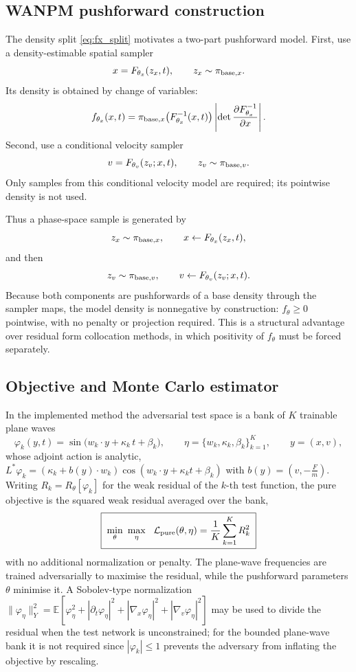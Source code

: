 \documentclass[11pt]{article}
\newcommand{\E}{\mathbb{E}}
\newcommand{\ph}{\varphi}
\theoremstyle{plain}
\begin{document}
\subsection{WANPM pushforward construction}

The density split \eqref{eq:fx_split} motivates a two-part pushforward model. First, use a density-estimable spatial sampler
\[
x=F_{\theta_x}(z_x,t),
\qquad z_x\sim \pi_{{\rm base},x}.
\]
Its density is obtained by change of variables:
\begin{equation}
f_{\theta_x}(x,t)
=
\pi_{{\rm base},x}\big(F_{\theta_x}^{-1}(x,t)\big)
\left|\det\frac{\partial F_{\theta_x}^{-1}}{\partial x}\right|.
\label{eq:flow_density}
\end{equation}
Second, use a conditional velocity sampler
\[
v=F_{\theta_v}(z_v;x,t),
\qquad z_v\sim \pi_{{\rm base},v}.
\]
Only samples from this conditional velocity model are required; its pointwise density is not used.

Thus a phase-space sample is generated by
\[
z_x\sim\pi_{{\rm base},x},\qquad x\leftarrow F_{\theta_x}(z_x,t),
\]
and then
\[
z_v\sim\pi_{{\rm base},v},\qquad v\leftarrow F_{\theta_v}(z_v;x,t).
\]
Because both components are pushforwards of a base density through the sampler maps, the model density is nonnegative by construction: $f_{\theta}\ge 0$ pointwise, with no penalty or projection required. This is a structural advantage over residual form collocation methods, in which positivity of $f_{\theta}$ must be forced separately.

\subsection{Objective and Monte Carlo estimator}

In the implemented method the adversarial test space is a bank of $K$ trainable plane waves
\begin{equation}
\ph_k(y,t)=\sin\!\big(w_k\cdot y+\kappa_k\,t+\beta_k\big),\qquad
\eta=\{w_k,\kappa_k,\beta_k\}_{k=1}^{K},\qquad y=(x,v),
\label{eq:planewave}
\end{equation}
whose adjoint action is analytic,
$L^\ast\ph_k=(\kappa_k+b(y)\cdot w_k)\cos(w_k\cdot y+\kappa_k t+\beta_k)$ with $b(y)=(v,-\tfrac{F}{m})$.
Writing $R_k=R_\theta[\ph_k]$ for the weak residual of the $k$-th test function, the pure objective is the
squared weak residual averaged over the bank,
\begin{equation}
\boxed{\;\min_\theta\ \max_\eta\ \ \mathcal L_{\rm pure}(\theta,\eta)=\frac1K\sum_{k=1}^{K}R_k^2\;}
\label{eq:minmax}
\end{equation}
with no additional normalization or penalty. The plane-wave frequencies are  trained adversarially to maximise the residual, while the pushforward parameters $\theta$ minimise it. A Sobolev-type
normalization $\|\ph_\eta\|_Y^2=\E[\ph_\eta^2+|\partial_t\ph_\eta|^2+|\nabla_x\ph_\eta|^2+|\nabla_v\ph_\eta|^2]$
may be used to divide the residual when the test network is unconstrained; for the bounded plane-wave bank it is not required since  $|\ph_k|\le1$ prevents the adversary from inflating the objective by rescaling.
\end{document}
